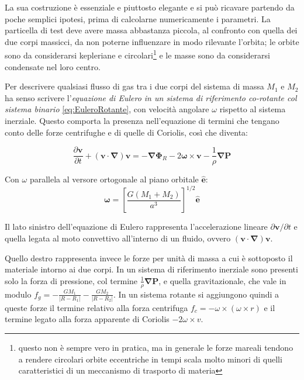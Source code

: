 \documentclass[a4paperbi]{article}
\begin{document}
	La sua costruzione è essenziale e piuttosto elegante e si può ricavare partendo da poche semplici ipotesi, prima di calcolarne numericamente i parametri. La particella di test deve avere massa abbastanza piccola, al confronto con quella dei due corpi massicci, da non poterne influenzare in modo rilevante l'orbita; le orbite sono da considerarsi kepleriane e circolari\footnote{questo non è sempre vero in pratica, ma in generale le forze mareali tendono a rendere circolari orbite eccentriche in tempi scala molto minori di quelli caratteristici di un meccanismo di trasporto di materia} e le masse sono da considerarsi condensate nel loro centro.
	
	Per descrivere qualsiasi flusso di gas tra i due corpi del sistema di massa $M_1$ e $M_2$ ha senso scrivere l'\textit{equazione di Eulero in un sistema di riferimento co-rotante col sistema binario} \eqref{eq:EuleroRotante}, con velocità angolare $\omega$ rispetto al sistema inerziale. Questo comporta la presenza nell'equazione di termini che tengano conto delle forze centrifughe e di quelle di Coriolis, così che diventa:
	
	\begin{equation}\label{eq:EuleroRotante}
		\frac{\partial \bm{v}}{\partial t}+(\bm{v}\cdot\bm{\nabla})\bm{v}=-\bm{\nabla}\bm{\Phi}_R-2\bm{\omega}\times\bm{v}-\frac{1}{\rho}\bm{\nabla}\bm{P}
	\end{equation}
	
	Con $\omega$ parallela al versore ortogonale al piano orbitale $\bm{\hat{e}}$:
	\begin{equation}
		\bm{\omega}=\left[\frac{G(M_1+M_2)}{a^3}\right]^{1/2}\bm{\hat{e}}
	\end{equation}
		
	Il lato sinistro dell'equazione di Eulero rappresenta l'accelerazione lineare $\partial \bm{v}/\partial t$ e quella legata al moto convettivo all'interno di un fluido, ovvero $(\bm{v}\cdot\bm{\nabla})\bm{v}$. 
	
	Quello destro rappresenta invece le forze per unità di massa a cui è sottoposto il materiale intorno ai due corpi. In un sistema di riferimento inerziale sono presenti solo la forza di pressione, col termine $\frac{1}{\rho}\bm{\nabla}\bm{P}$, e quella gravitazionale, che vale in modulo $f_g=-\frac{GM_1}{|R-R_1|}-\frac{GM_2}{|R-R_2|}$. In un sistema rotante si aggiungono quindi a queste forze il termine relativo alla forza centrifuga $f_c=-\omega\times(\omega\times r)$ e il termine legato alla forza apparente di Coriolis $-2\omega\times\textit{v}$.
	
\end{document}
